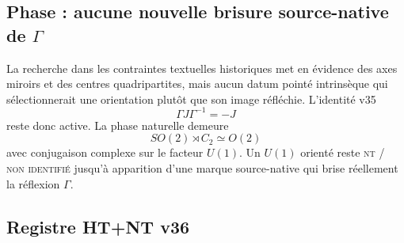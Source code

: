 \documentclass[11pt,a4paper]{article}
\newcommand{\statusNT}{\textsc{nt / non identifié}}
\begin{document}
\subsection{Phase : aucune nouvelle brisure source-native de $\Gamma$}

La recherche dans les contraintes textuelles historiques met en évidence des axes miroirs et des centres quadripartites, mais aucun datum pointé intrinsèque qui sélectionnerait une orientation plutôt que son image réfléchie. L'identité v35
\[
\Gamma J\Gamma^{-1}=-J
\]
reste donc active. La phase naturelle demeure
\[
\boxed{SO(2)\rtimes C_2\simeq O(2)}
\]
avec conjugaison complexe sur le facteur $U(1)$. Un $U(1)$ orienté reste \statusNT{} jusqu'à apparition d'une marque source-native qui brise réellement la réflexion $\Gamma$.

\subsection{Registre HT+NT v36}
\end{document}
